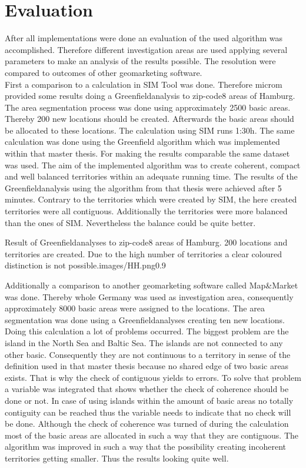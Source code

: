 \section{Evaluation}

After all implementations were done an evaluation of the used algorithm was accomplished. Therefore different investigation areas are used applying several parameters to make an analysis of the results possible. The resolution were compared to outcomes of other geomarketing software. \\
First a comparison to a calculation in SIM Tool was done. Therefore microm provided some results doing a Greenfieldanalysis to zip-code8 areas of Hamburg. The area segmentation process was done using approximately 2500 basic areas. Thereby 200 new locations should be created. Afterwards the basic areas should be allocated to these locations. The calculation using SIM runs 1:30h. The same calculation was done using the Greenfield algorithm which was implemented within that master thesis. For making the results comparable the same dataset was used. The aim of the implemented algorithm was to create coherent, compact and well balanced territories within an adequate running time. The results of the Greenfieldanalysis using the algorithm from that thesis were achieved after 5 minutes. Contrary to the territories which were created by SIM, the here created territories were all contiguous. Additionally the territories were more balanced than the ones of SIM. Nevertheless the balance could be quite better.

\begin{figurevarSize}{Result of Greenfieldanalyses to zip-code8 areas of Hamburg. 200 locations and territories are created. Due to the high number of territories a clear coloured distinction is not possible.}{images/HH.png}{0.9}\end{figurevarSize}


Additionally a comparison to another geomarketing software called Map\&Market was done. Thereby whole Germany was used as investigation area, consequently approximately 8000 basic areas were assigned to the locations. The area segmentation was done using a Greenfieldanalyses creating ten new locations. Doing this calculation a lot of problems occurred. The biggest problem are the island in the North Sea and Baltic Sea. The islands are not connected to any other basic. Consequently they are not continuous to a territory in sense of the definition used in that master thesis because no shared edge of two basic areas exists. That is why the check of contiguous yields to errors. To solve that problem a variable was integrated that shows whether the check of coherence should be done or not. In case of using islands within the amount of basic areas no totally contiguity can be reached thus the variable needs to indicate that no check will be done. Although the check of coherence was turned of during the calculation most of the basic areas are allocated in such a way that they are contiguous. The algorithm was improved in such a way that the possibility creating incoherent territories getting smaller. Thus the results looking quite well. 


